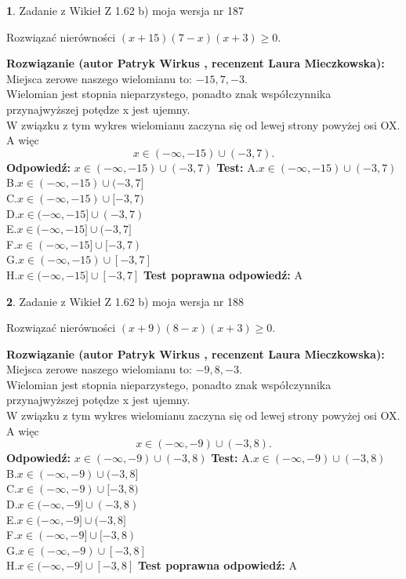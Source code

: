 \documentclass[12pt, a4paper]{article}
\theoremstyle{definition} %
\newtheorem{zad}{}
\newcommand{\zadStart}[1]{\begin{zad}#1\newline}
\newcommand{\zadStop}{\end{zad}}
\newcommand{\rozwStart}[2]{\noindent \textbf{Rozwiązanie (autor #1 , recenzent #2): }\newline}
\newcommand{\rozwStop}{\newline}
\newcommand{\odpStart}{\noindent \textbf{Odpowiedź:}\newline}
\newcommand{\odpStop}{\newline}
\newcommand{\testStart}{\noindent \textbf{Test:}\newline}
\newcommand{\testStop}{\newline}
\newcommand{\kluczStart}{\noindent \textbf{Test poprawna odpowiedź:}\newline}
\newcommand{\kluczStop}{\newline}
\begin{document}
\zadStart{Zadanie z Wikieł Z 1.62 b) moja wersja nr 187}

Rozwiązać nierówności $(x+15)(7-x)(x+3)\ge0$.
\zadStop
\rozwStart{Patryk Wirkus}{Laura Mieczkowska}
Miejsca zerowe naszego wielomianu to: $-15, 7, -3$.\\
Wielomian jest stopnia nieparzystego, ponadto znak współczynnika przy\linebreak najwyższej potędze x jest ujemny.\\ W związku z tym wykres wielomianu zaczyna się od lewej strony powyżej osi OX. A więc $$x \in (-\infty,-15) \cup (-3,7).$$
\rozwStop
\odpStart
$x \in (-\infty,-15) \cup (-3,7)$
\odpStop
\testStart
A.$x \in (-\infty,-15) \cup (-3,7)$\\
B.$x \in (-\infty,-15) \cup (-3,7]$\\
C.$x \in (-\infty,-15) \cup [-3,7)$\\
D.$x \in (-\infty,-15] \cup (-3,7)$\\
E.$x \in (-\infty,-15] \cup (-3,7]$\\
F.$x \in (-\infty,-15] \cup [-3,7)$\\
G.$x \in (-\infty,-15) \cup [-3,7]$\\
H.$x \in (-\infty,-15] \cup [-3,7]$
\testStop
\kluczStart
A
\kluczStop



\zadStart{Zadanie z Wikieł Z 1.62 b) moja wersja nr 188}

Rozwiązać nierówności $(x+9)(8-x)(x+3)\ge0$.
\zadStop
\rozwStart{Patryk Wirkus}{Laura Mieczkowska}
Miejsca zerowe naszego wielomianu to: $-9, 8, -3$.\\
Wielomian jest stopnia nieparzystego, ponadto znak współczynnika przy\linebreak najwyższej potędze x jest ujemny.\\ W związku z tym wykres wielomianu zaczyna się od lewej strony powyżej osi OX. A więc $$x \in (-\infty,-9) \cup (-3,8).$$
\rozwStop
\odpStart
$x \in (-\infty,-9) \cup (-3,8)$
\odpStop
\testStart
A.$x \in (-\infty,-9) \cup (-3,8)$\\
B.$x \in (-\infty,-9) \cup (-3,8]$\\
C.$x \in (-\infty,-9) \cup [-3,8)$\\
D.$x \in (-\infty,-9] \cup (-3,8)$\\
E.$x \in (-\infty,-9] \cup (-3,8]$\\
F.$x \in (-\infty,-9] \cup [-3,8)$\\
G.$x \in (-\infty,-9) \cup [-3,8]$\\
H.$x \in (-\infty,-9] \cup [-3,8]$
\testStop
\kluczStart
A
\kluczStop
\end{document}

